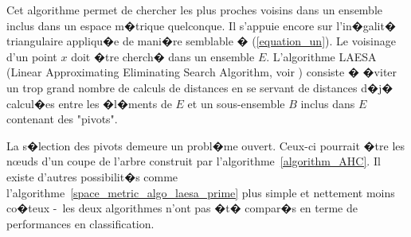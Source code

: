 \label{space_metric_laesa_laesa}

Cet algorithme permet de chercher les plus proches voisins dans un ensemble inclus dans un espace m�trique quelconque. Il s'appuie encore sur l'in�galit� triangulaire appliqu�e de mani�re semblable � (\ref{equation_un}). Le voisinage d'un point $x$ doit �tre cherch� dans un ensemble $E$. L'algorithme LAESA (Linear Approximating Eliminating Search Algorithm, voir ) consiste � �viter un trop grand nombre de calculs de distances en se servant de distances d�j� calcul�es entre les �l�ments de $E$ et un sous-ensemble $B$ inclus dans $E$ contenant des "pivots". 

La s�lection des pivots demeure un probl�me ouvert. Ceux-ci pourrait �tre les n\oe uds d'un coupe de l'arbre construit par l'algorithme~\ref{algorithm_AHC}. Il existe d'autres possibilit�s comme l'algorithme~\ref{space_metric_algo_laesa_prime} plus simple et nettement moins co�teux -~les deux algorithmes n'ont pas �t� compar�s en terme de performances en classification. 




